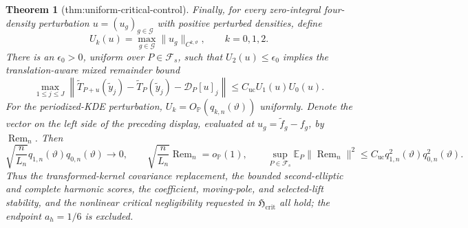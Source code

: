 \documentclass{article}
\newtheorem{theorem}{Theorem}
\begin{document}
\begin{theorem}[thm:uniform-critical-control]
Finally, for every zero-integral four-density perturbation \(u=(u_g)_{g\in\mathcal G}\) with positive perturbed densities, define
\[
 U_k(u)=\max_{g\in\mathcal G}\lVert u_g\rVert_{C^{k,\vartheta}},
 \qquad k=0,1,2.
\]
There is an \(\epsilon_0>0\), uniform over \(P\in\mathcal F_s\), such that \(U_2(u)\leq\epsilon_0\) implies the translation-aware mixed remainder bound
\[
 \max_{1\leq j\leq J}
 \left\lVert
 \widetilde T_{P+u}(\widetilde y_j)-\widetilde T_P(\widetilde y_j)
 -\mathcal D_P[u]_j
 \right\rVert
 \leq C_{\mathrm{uc}} U_1(u)U_0(u).
\]
For the periodized-KDE perturbation, \(U_k=O_{\mathbb P}(q_{k,n}(\vartheta))\) uniformly.  Denote the vector on the left side of the preceding display, evaluated at \(u_g=\widetilde f_g-f_g\), by \(\operatorname{Rem}_n\).  Then
\[
 \sqrt{\frac n{L_n}}q_{1,n}(\vartheta)q_{0,n}(\vartheta)\to0,
 \qquad
 \sqrt{\frac n{L_n}}\operatorname{Rem}_n=o_{\mathbb P}(1),
 \qquad
 \sup_{P\in\mathcal F_s}\mathbb E_P
 \lVert\operatorname{Rem}_n\rVert^2
 \leq C_{\mathrm{uc}}q_{1,n}^2(\vartheta)q_{0,n}^2(\vartheta).
\]
Thus the transformed-kernel covariance replacement, the bounded second-elliptic and complete harmonic scores, the coefficient, moving-pole, and selected-lift stability, and the nonlinear critical negligibility requested in \(\mathfrak H_{\mathrm{crit}}\) all hold; the endpoint \(a_h=1/6\) is excluded.
\end{theorem}
\end{document}
